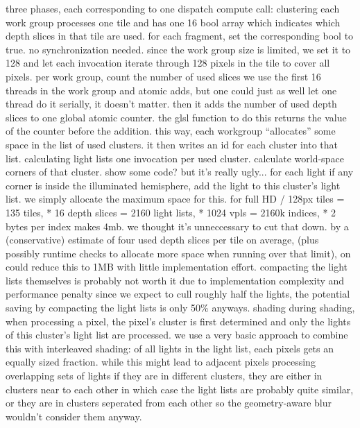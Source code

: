 \begin{outline}
\1 three phases, each corresponding to one dispatch compute call:
\1 clustering
    \2 each work group processes one tile and has one 16 bool array which indicates which depth slices in that tile are used.
    \2 for each fragment, set the corresponding bool to true. no synchronization needed.
    \2 since the work group size is limited, we set it to 128 and let each invocation iterate through 128 pixels in the tile to cover all pixels.
    \2 per work group, count the number of used slices
        \3 we use the first 16 threads in the work group and atomic adds, but one could just as well let one thread do it serially, it doesn't matter.
    \2 then it adds the number of used depth slices to one global atomic counter. the glsl function to do this returns the value of the counter before the addition.
    \2 this way, each workgroup ``allocates'' some space in the list of used clusters. it then writes an id for each cluster into that list.
\1 calculating light lists
    \2 one invocation per used cluster.
    \2 calculate world-space corners of that cluster.
    \2 show some code? but it's really ugly...
    \2 for each light
        \3 if any corner is inside the illuminated hemisphere, add the light to this cluster's light list.
    \2 we simply allocate the maximum space for this.
        \3 for full HD / 128px tiles = 135 tiles, * 16 depth slices = 2160 light lists, * 1024 vpls = 2160k indices, * 2 bytes per index makes 4mb.
        \3 we thought it's unneccessary to cut that down.
        \3 by a (conservative) estimate of four used depth slices per tile on average, (plus possibly runtime checks to allocate more space when running over that limit), on could reduce this to 1MB with little implementation effort.
        \3 compacting the light lists themselves is probably not worth it due to implementation complexity and performance penalty
        \3 since we expect to cull roughly half the lights, the potential saving by compacting the light lists is only 50\% anyways.
\1 shading
    \2 during shading, when processing a pixel, the pixel's cluster is first determined and only the lights of this cluster's light list are processed.
    \2 we use a very basic approach to combine this with interleaved shading: of all lights in the light list, each pixels gets an equally sized fraction. while this might lead to adjacent pixels processing overlapping sets of lights if they are in different clusters, they are either in clusters near to each other in which case the light lists are probably quite similar, or they are in clusters seperated from each other so the geometry-aware blur wouldn't consider them anyway.

\end{outline}
